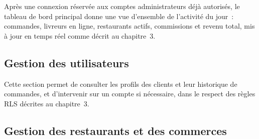 \documentclass[12pt,fleqn,a4paper]{report}
\begin{document}
\begin{justify}

Après une connexion réservée aux comptes administrateurs déjà autorisés, le tableau de bord principal donne une vue d'ensemble de l'activité du jour~: commandes, livreurs en ligne, restaurants actifs, commissions et revenu total, mis à jour en temps réel comme décrit au chapitre~3.

\subsection{Gestion des utilisateurs}


Cette section permet de consulter les profils des clients et leur historique de commandes, et d'intervenir sur un compte si nécessaire, dans le respect des règles RLS décrites au chapitre~3.

\subsection{Gestion des restaurants et des commerces}



\end{justify}
\end{document}

